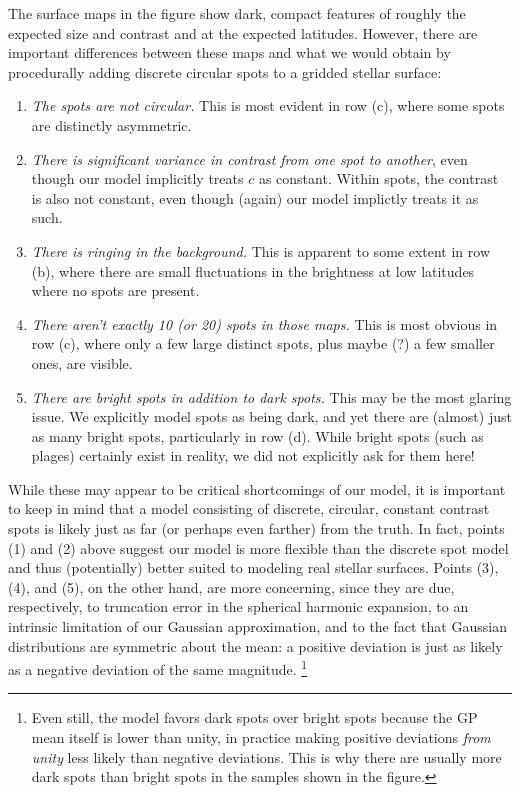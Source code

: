\documentclass[modern]{aastex62}
\begin{document}
The surface maps in the figure show dark, compact features of roughly the expected
size and contrast and at the expected latitudes. However, there are important
differences between these maps and what we would obtain by procedurally adding discrete
circular spots to a gridded stellar surface:
%
\begin{enumerate}
    \item \emph{The spots are not circular.} This is most evident in row (c),
          where some spots are distinctly asymmetric.
    \item \emph{There is significant variance in contrast from one spot to another},
          even though our model
          implicitly treats $c$ as constant. Within spots, the contrast is also
          not constant, even though (again) our model implictly treats it as such.
    \item \emph{There is ringing in the background.} This is apparent to some extent in
          row (b), where there are small fluctuations in the brightness at low
          latitudes where no spots are present.
    \item \emph{There aren't exactly 10 (or 20) spots in those maps.} This is
          most obvious in row (c), where only a few large distinct spots,
          plus maybe (?) a few smaller ones, are visible.
    \item \emph{There are bright spots in addition to dark spots.} This may be
          the most glaring issue. We explicitly model spots as being dark, and yet
          there are (almost) just as many bright spots, particularly in row (d).
          While bright spots (such as plages) certainly exist in reality, we did not
          explicitly ask for them here!
\end{enumerate}
%
While these may appear to be critical shortcomings of our model, it is
important to keep in mind that a model consisting of discrete, circular, constant
contrast spots is likely just as far (or perhaps even farther) from the truth. In fact,
points (1) and (2) above suggest our model is more flexible than the discrete
spot model and thus (potentially) better suited to modeling real stellar surfaces.
Points (3), (4), and (5), on the other hand, are more concerning, since they are due,
respectively, to truncation error in the spherical harmonic expansion,
to an intrinsic limitation of our Gaussian approximation,
and to the fact that Gaussian distributions are symmetric about the mean: a positive
deviation is just as likely as a negative deviation of the same magnitude.%
\footnote{
    Even still, the model favors dark spots over bright spots because the GP mean
    itself is lower than unity, in practice making
    positive deviations \emph{from unity} less likely than negative
    deviations. This is why there are usually more dark spots than bright spots in
    the samples shown in the figure.
}
\end{document}
